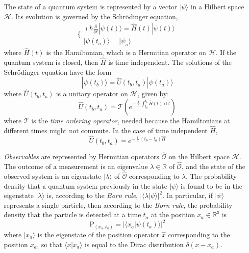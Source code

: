 \documentclass[12pt]{amsart}
\theoremstyle{definition}
\theoremstyle{plain}
\begin{document}
The state of a quantum system is represented by a vector $|{\psi}\rangle$ in a Hilbert space $\mathcal{H}$. Its evolution is governed by the Schr\"odinger equation, 
\begin{equation}
\label{eq_schrod}
\Bigg\{
\begin{array}{ll}
	\imath\hbar\frac{\partial}{\partial t}|{\psi(t)}\rangle=\hat H(t)|{\psi(t)}\rangle \\
	|{\psi(t_a)}\rangle=|{\psi_a}\rangle
\end{array}
\end{equation}
where $\hat H(t)$ is the Hamiltonian, which is a Hermitian operator on $\mathcal{H}$. If the quantum system is closed, then $\hat H$ is time independent.
The solutions of the Schr\"odinger equation have the form
\begin{equation}
\label{eq_unitary_evolution}
|{\psi(t_b)}\rangle=\hat U(t_b,t_a)|{\psi(t_a)}\rangle
\end{equation}
where $\hat U(t_b,t_a)$ is a unitary operator on $\mathcal{H}$, given by:
\begin{equation}
\label{eq_unitary_evolution_operator}
\hat U(t_b,t_a) = \mathcal T\left(e^{-\frac{\imath}{\hbar} \int_{t_a}^{t_b}\hat H(t)\operatorname{d} t}\right)
\end{equation}
where $\mathcal T$ is the \emph{time ordering operator}, needed because the Hamiltonians at different times might not commute.
In the case of time independent $\hat H$,
\begin{equation}
\label{eq_unitary_evolution_operator_time_independent}
\hat U(t_b,t_a)=e^{-\frac{\imath}{\hbar} \left(t_b-t_a\right)\hat H}
\end{equation}

\emph{Observables} are represented by Hermitian operators $\hat {\mathcal O}$ on the Hilbert space $\mathcal{H}$. The outcome of a measurement is an eigenvalue $\lambda\in\mathbb{R}$ of $\hat {\mathcal O}$, and the state of the observed system is an eigenstate $|{\lambda}\rangle$ of $\hat {\mathcal O}$ corresponding to $\lambda$. The probability density that a quantum system previously in the state $|{\psi}\rangle$ is found to be in the eigenstate $|{\lambda}\rangle$ is, according to the \emph{Born rule}, $|\langle{\lambda}|{\psi}\rangle|^2$.
In particular, if $|{\psi}\rangle$ represents a single particle, then according to the \emph{Born rule}, the probability density that the particle is detected at a time $t_a$ at the position $x_a\in\mathbb{R}^3$ is
\begin{equation}
\label{eq_Born_rule_position}
\text{P}_{(x_a,t_a)}=|\langle{x_a}|{\psi(t_a)}\rangle|^2
\end{equation}
where $|{x_a}\rangle$ is the eigenstate of the position operator $\hat x$ corresponding to the position $x_a$, so that $\langle{x}|{x_a}\rangle$ is equal to the Dirac distribution $\delta(x-x_a)$.
\end{document}
